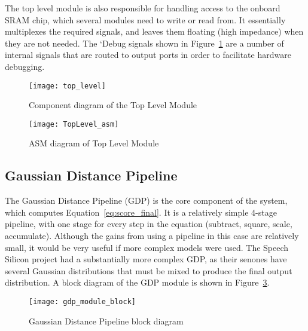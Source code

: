 		The top level module is also responsible for handling access to the onboard SRAM chip, which several modules need to write or read from.  It essentially multiplexes the required signals, and leaves them floating (high impedance) when they are not needed.  The `Debug signals shown in Figure~\ref{fig:toplevel} are a number of internal signals that are routed to output ports in order to facilitate hardware debugging.

		\begin{figure}[tb]
			\begin{center}
				\texttt{[image: top\_level]}
			\end{center}
			\caption{Component diagram of the Top Level Module}
			\label{fig:toplevel}
		\end{figure}

		\begin{figure}[tb]
			\begin{center}
				\texttt{[image: TopLevel\_asm]}
			\end{center}
			\caption{ASM diagram of Top Level Module}
			\label{fig:topstatemachine}
		\end{figure}

	\subsection{Gaussian Distance Pipeline} %
	\label{sub:gaussian_distance_pipeline}
		The Gaussian Distance Pipeline (GDP) is the core component of the system, which computes Equation~\ref{eq:score_final}.  It is a relatively simple 4-stage pipeline, with one stage for every step in the equation (subtract, square, scale, accumulate).  Although the gains from using a pipeline in this case are relatively small, it would be very useful if more complex models were used.  The Speech Silicon \cite{schuster2006speech} project had a substantially more complex GDP, as their senones have several Gaussian distributions that must be mixed to produce the final output distribution.  A block diagram of the GDP module is shown in Figure~\ref{fig:gdp_block}.  %

		\begin{figure}[tb]
			\begin{center}
				\texttt{[image: gdp\_module\_block]}
			\end{center}
			\caption{Gaussian Distance Pipeline block diagram}
			\label{fig:gdp_block}
		\end{figure}

